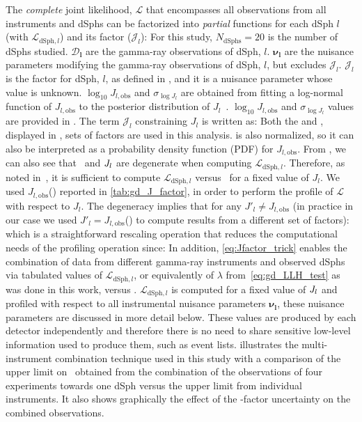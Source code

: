 The \textit{complete} joint likelihood, $\mathcal{L}$ that encompasses all observations from all instruments and dSphs can be factorized into \textit{partial} functions for each dSph $l$ (with $\mathcal{L}_{\mathrm{dSph}, l}$) and its \J factor ($\mathcal{J}_l$):
\CompleteGDLLH
For this study, $N_{\mathrm{dSphs}}=20$ is the number of dSphs studied.
$\bm{\mathcal{D}_{l}}$ are the gamma-ray observations of dSph, $l$.
$\bm{\nu_l}$ are the nuisance parameters modifying the gamma-ray observations of dSph, $l$, but excludes $\mathcal{J}_l$.
$\mathcal{J}_l$ is the \J factor for dSph, $l$, as defined in , and it is a nuisance parameter whose value is unknown.
$\log_{10} J_{l,\mathrm{obs}}$ and $\sigma_{\log{J_l}}$ are obtained from fitting a log-normal function of $J_{l,\mathrm{obs}}$ to the posterior distribution of $J_{l}$~\cite{2015PhRvL.115w1301A}.
$\log_{10} J_{l,\mathrm{obs}}$ and $\sigma_{\log{J_l}}$ values are provided in .
The term $\mathcal{J}_l$ constraining $J_l$ is written as:
\JLgdLLH
Both the \GS and \B, displayed in , sets of \J factors are used in this analysis.
 is also normalized, so it can also be interpreted as a probability density function (PDF) for $J_{l,\mathrm{obs}}$.
From , we can also see that \sv~and $J_l$ are degenerate when computing $\mathcal{L}_{\mathrm{dSph},l}$.
Therefore, as noted in~\cite{MAGICFermi_combo}, it is sufficient to compute $\mathcal{L}_{\mathrm{dSph},l}$ versus \sv~for a fixed value of $J_{l}$.
We used $J_{l,\mathrm{obs}}$(\GS) reported in \cref{tab:gd_J_factor}, in order to perform the profile of $\mathcal{L}$ with respect to $J_l$.
The degeneracy implies that for any $J'_l \neq J_{l,\mathrm{obs}}$ (in practice in our case we used $J'_l = J_{l,\mathrm{obs}}$(\B) to compute results from a different set of \J factors):
\jfacTrick
which is a straightforward rescaling operation that reduces the computational needs of the profiling operation since:
\rescaleTrick
In addition, \cref{eq:Jfactor_trick} enables the combination of data from different gamma-ray instruments and observed dSphs via tabulated values of $\mathcal{L}_{\mathrm{dSph},l}$, or equivalently of $\lambda$ from~\cref{eq:gd_LLH_test} as was done in this work, versus \sv.
$\mathcal{L}_{\mathrm{dSph},l}$ is computed for a fixed value of $J_l$ and profiled with respect to all instrumental nuisance parameters $\bm{\nu_l}$, these nuisance parameters are discussed in more detail below.
These values are produced by each detector independently and therefore there is no need to share sensitive low-level information used to produce them, such as event lists.
 illustrates the multi-instrument combination technique used in this study with a comparison of the upper limit on \sv~obtained from the combination of the observations of four experiments towards one dSph versus the upper limit from individual instruments.
It also shows graphically the effect of the \J-factor uncertainty on the combined observations.

